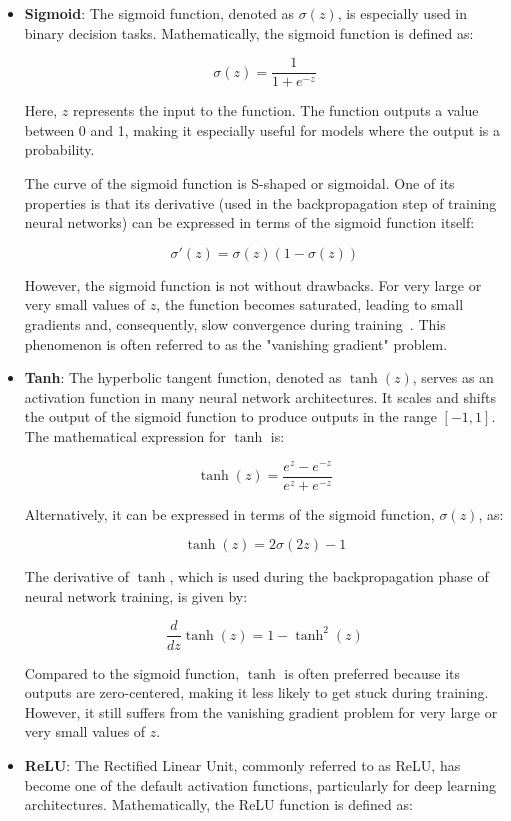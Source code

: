 \begin{itemize}
	\item \textbf{Sigmoid}: 
The sigmoid function, denoted as \( \sigma(z) \), is especially used in binary decision tasks. Mathematically, the sigmoid function is defined as:

\[
\sigma(z) = \frac{1}{1 + e^{-z}}
\]

Here, \( z \) represents the input to the function. The function outputs a value between 0 and 1, making it especially useful for models where the output is a probability. 

The curve of the sigmoid function is S-shaped or sigmoidal. One of its properties is that its derivative (used in the backpropagation step of training neural networks) can be expressed in terms of the sigmoid function itself:

\[
\sigma'(z) = \sigma(z)(1 - \sigma(z))
\]

However, the sigmoid function is not without drawbacks. For very large or very small values of \( z \), the function becomes saturated, leading to small gradients and, consequently, slow convergence during training~\cite{glorot2010understanding}. This phenomenon is often referred to as the "vanishing gradient" problem.
	
	\item \textbf{Tanh}: 
The hyperbolic tangent function, denoted as \( \tanh(z) \), serves as an activation function in many neural network architectures. It scales and shifts the output of the sigmoid function to produce outputs in the range \([-1, 1]\). The mathematical expression for \( \tanh \) is:

\[
\tanh(z) = \frac{e^{z} - e^{-z}}{e^{z} + e^{-z}}
\]

Alternatively, it can be expressed in terms of the sigmoid function, \( \sigma(z) \), as:

\[
\tanh(z) = 2\sigma(2z) - 1
\]

The derivative of \( \tanh \), which is used during the backpropagation phase of neural network training, is given by:

\[
\frac{d}{dz}\tanh(z) = 1 - \tanh^2(z)
\]

Compared to the sigmoid function, \( \tanh \) is often preferred because its outputs are zero-centered, making it less likely to get stuck during training. However, it still suffers from the vanishing gradient problem for very large or very small values of \( z \).
	
	\item \textbf{ReLU}: 
The Rectified Linear Unit, commonly referred to as ReLU, has become one of the default activation functions, particularly for deep learning architectures. Mathematically, the ReLU function is defined as:


\end{itemize}
